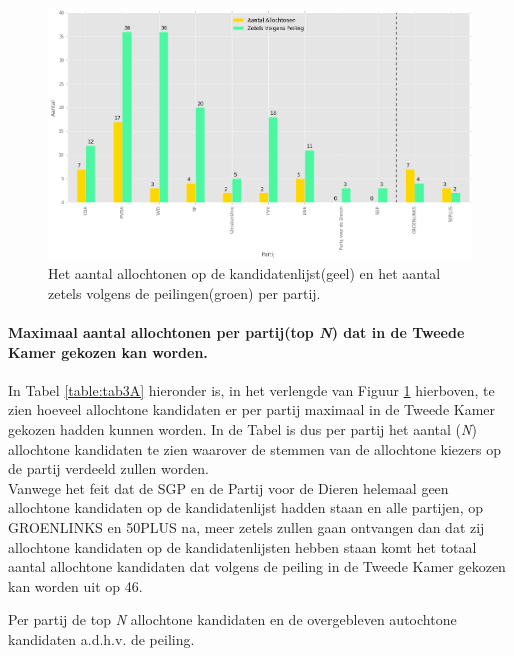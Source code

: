 \begin{figure}[H]

	\includegraphics[width=\linewidth]	{Aantal_allochtonen_aantal_zetels1.png}

			\caption{Het aantal allochtonen op de kandidatenlijst(geel) en het aantal zetels volgens de peilingen(groen) per partij.}

\label{fig:zetelsA}
\end{figure}


\paragraph{Maximaal aantal allochtonen per partij(top \textit{N}) dat in de Tweede Kamer gekozen kan worden.}
In Tabel \ref{table:tab3A} hieronder is, in het verlengde van Figuur \ref{fig:zetelsA} hierboven, te zien hoeveel allochtone kandidaten er per partij maximaal in de Tweede Kamer gekozen hadden kunnen worden. In de Tabel is dus per partij het aantal (\textit{N}) allochtone kandidaten te zien waarover de stemmen van de allochtone kiezers op de partij verdeeld zullen worden.  
\\
\indent Vanwege het feit dat de SGP en de Partij voor de Dieren helemaal geen allochtone kandidaten op de kandidatenlijst hadden staan en alle partijen, op GROENLINKS en 50PLUS na, meer zetels zullen gaan ontvangen dan dat zij allochtone kandidaten op de kandidatenlijsten hebben staan komt het totaal aantal allochtone kandidaten dat volgens de peiling in de Tweede Kamer gekozen kan worden uit op 46. 





\begin{table}[H]
\centering
	\begin{footnotesize}
		
	\end{footnotesize}
			\caption{Per partij de top \textit{N} allochtone kandidaten en de overgebleven autochtone kandidaten a.d.h.v. de peiling.}
\label{table:tab3A} 
\end{table}



